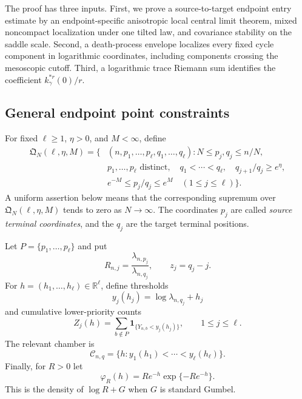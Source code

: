 \documentclass[11pt]{article}
\theoremstyle{remark}
\newcommand{\one}{\mathbf 1}
\begin{document}
The proof has three inputs.  First, we prove a source-to-target endpoint entry
estimate by an endpoint-specific anisotropic local central limit theorem,
mixed noncompact localization under one tilted law, and covariance stability
on the saddle scale.  Second, a death-process envelope localizes every fixed
cycle component in logarithmic coordinates, including components crossing the
mesoscopic cutoff.  Third, a logarithmic trace Riemann sum identifies the
coefficient $k_\gamma^{*r}(0)/r$.

\subsection{General endpoint point constraints}

For fixed $\ell\ge1$, $\eta>0$, and $M<\infty$, define
\[
\begin{aligned}
\mathfrak Q_N(\ell,\eta,M)=\bigl\{&(n,p_1,\ldots,p_\ell,
 q_1,\ldots,q_\ell):
 N\le p_j,q_j\le n/N,\\
& p_1,\ldots,p_\ell\text{ distinct},\quad
 q_1<\cdots<q_\ell,\quad
 q_{j+1}/q_j\ge e^\eta,\\
& e^{-M}\le p_j/q_j\le e^M\quad(1\le j\le\ell)
\bigr\}.
\end{aligned}
\tag{10.1}\label{eq:endpoint-point-admissible}
\]
A uniform assertion below means that the corresponding supremum over
$\mathfrak Q_N(\ell,\eta,M)$ tends to zero as $N\to\infty$.
The coordinates $p_j$ are called \emph{source terminal coordinates}, and the
$q_j$ are the target terminal positions.

Let $P=\{p_1,\ldots,p_\ell\}$ and put
\[
        R_{n,j}=\frac{\lambda_{n,p_j}}{\lambda_{n,q_j}},
        \qquad
        z_j=q_j-j.
\]
For $h=(h_1,\ldots,h_\ell)\in\mathbb R^\ell$, define thresholds
\[
        y_j(h_j)=\log\lambda_{n,q_j}+h_j
\]
and cumulative lower-priority counts
\[
        Z_j(h)=\sum_{b\notin P}
        \one_{\{Y_{n,b}<y_j(h_j)\}},
        \qquad 1\le j\le\ell.
\]
The relevant chamber is
\[
        \mathscr C_{n,q}
        =\{h:y_1(h_1)<\cdots<y_\ell(h_\ell)\}.
\]
Finally, for $R>0$ let
\[
        \varphi_R(h)=R e^{-h}\exp\{-R e^{-h}\}.
\tag{10.2}\label{eq:shifted-gumbel-density}
\]
This is the density of $\log R+G$ when $G$ is standard Gumbel.
\end{document}
